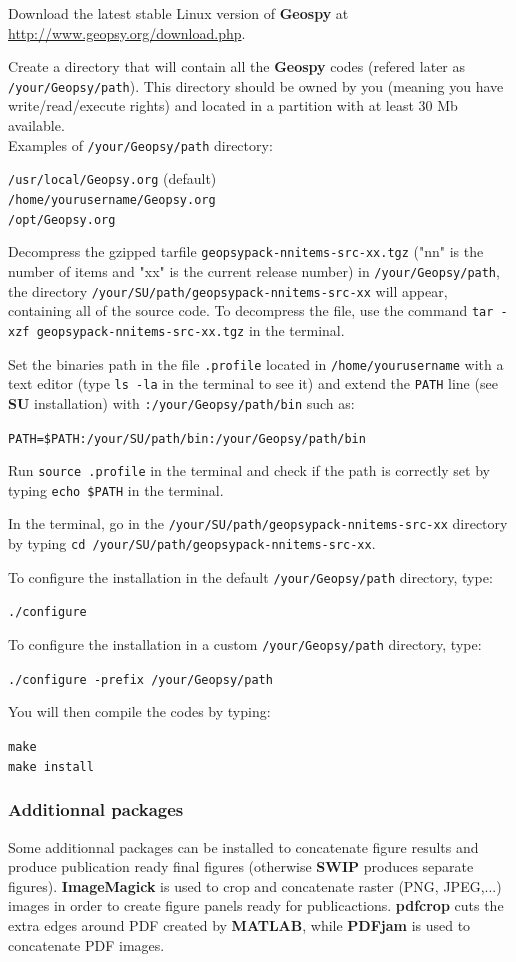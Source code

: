 \documentclass[twoside,a4paper]{article}
\def\SWIP{\textbf{SWIP}}
\def\SU{\textbf{SU}}
\def\Geopsy{\textbf{Geospy}}
\def\ImageMagick{\textbf{ImageMagick}}
\def\PDFjam{\textbf{PDFjam}}
\def\pdfcrop{\textbf{pdfcrop}}
\def\MATLAB{\textbf{MATLAB}}
\begin{document}
Download the latest stable Linux version of {\Geopsy} at \url{http://www.geopsy.org/download.php}.

Create a directory that will contain all the {\Geopsy} codes (refered later as \verb|/your/Geopsy/path|). This directory should be owned by you (meaning you have write/read/execute rights) and located in a partition with at least 30 Mb available.\\[1ex]
Examples of \verb|/your/Geopsy/path| directory:

\verb|/usr/local/Geopsy.org| (default)\\
\verb|/home/yourusername/Geopsy.org|\\
\verb|/opt/Geopsy.org|

Decompress the gzipped tarfile \verb|geopsypack-nnitems-src-xx.tgz| ("nn" is the number of items and "xx" is the current release number) in \verb|/your/Geopsy/path|, the directory \verb|/your/SU/path/geopsypack-nnitems-src-xx| will appear, containing all of the source code. To decompress the file, use the command \verb|tar -xzf geopsypack-nnitems-src-xx.tgz| in the terminal.

Set the binaries path in the file \verb|.profile| located in \verb|/home/yourusername| with a text editor (type \verb|ls -la| in the terminal to see it) and extend the \verb|PATH| line (see {\SU} installation) with \verb|:/your/Geopsy/path/bin| such as:

\verb|PATH=$PATH:/your/SU/path/bin:/your/Geopsy/path/bin|

Run \verb|source .profile| in the terminal and check if the path is correctly set by typing \verb|echo $PATH| in the terminal.

In the terminal, go in the \verb|/your/SU/path/geopsypack-nnitems-src-xx| directory by typing \verb|cd /your/SU/path/geopsypack-nnitems-src-xx|.

To configure the installation in the default \verb|/your/Geopsy/path| directory, type:

\verb|./configure|

To configure the installation in a custom \verb|/your/Geopsy/path| directory, type:

\verb|./configure -prefix /your/Geopsy/path|

You will then compile the codes by typing:

\verb|make|\\
\verb|make install|


\subsubsection{Additionnal packages}
Some additionnal packages can be installed to concatenate figure results and produce publication ready final figures (otherwise {\SWIP} produces separate figures). {\ImageMagick} is used to crop and concatenate raster (PNG, JPEG,...) images in order to create figure panels ready for publicactions. {\pdfcrop} cuts the extra edges around PDF created by {\MATLAB}, while {\PDFjam} is used to concatenate PDF images.
\end{document}
